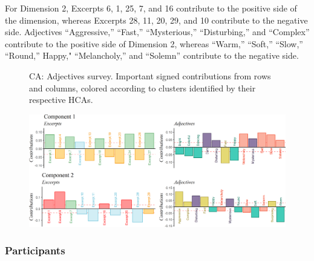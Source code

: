 \documentclass[
  english,
  man,floatsintext]{apa6}
\begin{document}
For Dimension 2, Excerpts 6, 1, 25, 7, and 16 contribute to the positive side of the dimension, whereas Excerpts 28, 11, 20, 29, and 10 contribute to the negative side. Adjectives ``Aggressive,'' ``Fast,'' ``Mysterious,'' ``Disturbing,'' and ``Complex'' contribute to the positive side of Dimension 2, whereas ``Warm,'' ``Soft,'' ``Slow,'' ``Round,'' Happy," ``Melancholy,'' and ``Solemn'' contribute to the negative side.

\begin{figure}   
  \centering  
  \caption{CA: Adjectives survey. Important signed contributions from rows and columns, colored according to clusters identified by their respective HCAs.}
    \includegraphics{./Music-Descriptor-Space_files/figure-latex/contributionsAcode-1.png}
  \label{fig:contributionsA}
  \caption*{}
\end{figure}

\hypertarget{participants-3}{%
\subsubsection{Participants}\label{participants-3}}

\end{document}
